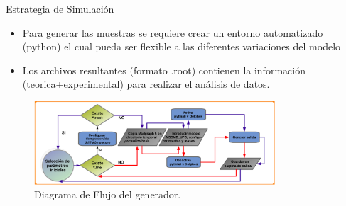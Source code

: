 \begin{frame}{Estrategia de Simulación}

\begin{itemize}
    \item Para generar las muestras se requiere crear un entorno automatizado (python) el cual pueda ser flexible a las diferentes variaciones del modelo
    \item Los archivos resultantes (formato .root) contienen la informaci\'on (teorica+experimental) para realizar el an\'alisis de datos.  
\end{itemize}

\begin{figure}[h]
\centering
\includegraphics[width=0.8\textwidth]{Imag/proyecto_darksusy2.png}
\caption{Diagrama de Flujo del generador.}
\end{figure}

    
\end{frame}


